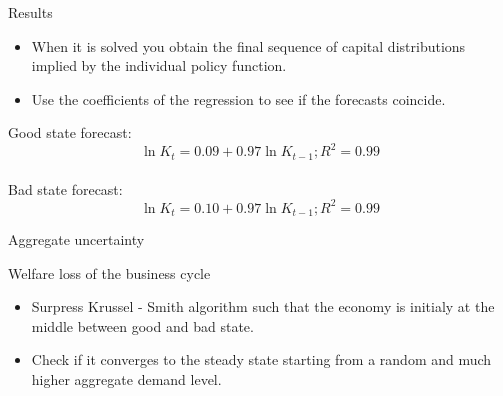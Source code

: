 \documentclass{beamer}
\begin{document}
\begin{frame}{Results}
  \begin{itemize}
    \item {
    When it is solved you obtain the final sequence of capital distributions implied by the individual policy function.
    }

    \item {
    Use the coefficients of the regression to see if the forecasts coincide.
    }

       

  \end{itemize}

 \textrm{Good state forecast:}  \\
  \[ \ln{K_t} = 0.09 + 0.97\ln{K_{t-1}}; R^2 = 0.99 \]\\
\textrm{Bad state forecast:} \\
  \[ \ln{K_t} = 0.10 + 0.97\ln{K_{t-1}}; R^2 = 0.99 \]

\end{frame}

\begin{frame}{Aggregate uncertainty}
\end{frame}

\begin{frame}{Welfare loss of the business cycle}
  \begin{itemize}


  \item {
  Surpress Krussel - Smith algorithm such that the economy is initialy at the middle between good and bad state.
  }


  \item {
  Check if it converges to the steady state starting from a random and much higher aggregate demand level.  
  }

  \end{itemize}
\end{frame}
\end{document}
